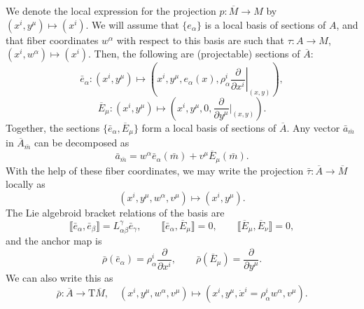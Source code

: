 \documentclass[11pt]{article}
\theoremstyle{plain}
\theoremstyle{definition}
\begin{document}
We denote the local expression for the projection $p\colon \overline{M}\to M$ by $(x^i,y^{\mu})\mapsto (x^i)$. We will assume that $\{e_{\alpha}\}$ is a local basis of sections of $A$, and that fiber coordinates $w^\alpha$ with respect to this basis are such that $\tau\colon A\to M$, $(x^i,w^{\alpha})\mapsto (x^i)$. Then, the following are (projectable) sections of $\overline{A}$: 
\begin{equation*} \label{eq:basis1}
    \bar{e}_{\alpha} \colon (x^i,y^{\mu})\longmapsto \left(x^i,y^{\mu},e_{\alpha}(x),\rho^i_\alpha \left.\frac{\partial}{\partial x^i}\right|_{(x,y)}\right),
\end{equation*}
\begin{equation*} \label{eq:basis2}
    \overline{E}_{\mu}\colon (x^i,y^{\mu})\longmapsto \left(x^i,y^{\mu},0,\frac{\partial}{\partial y^{\mu}}\Big|_{(x,y)}\right).
\end{equation*}
Together, the sections $\{\bar{e}_{\alpha},\overline{E}_{\mu}\}$ form a local basis of sections of $\overline{A}$. Any vector ${\bar a}_{\bar m}$ in ${\overline A}_{\bar m}$ can be decomposed as
\begin{equation*}
    {\bar a}_{\bar m} = w^\alpha {\bar e}_\alpha(\bar m)+ v^\mu {\overline{E}_\mu}(\bar m).
\end{equation*}
With the help of these fiber coordinates, we may write the projection $\bar\tau\colon \overline A \to \overline M$ locally as
\begin{equation*}
    (x^i,y^{\mu},w^{\alpha},v^{\mu})\longmapsto (x^i,y^{\mu}).
\end{equation*}
The Lie algebroid bracket relations of the basis are
\begin{equation*}\label{eqn:brackets}
    \llbracket \bar{e}_{\alpha},\bar{e}_{\beta}\rrbracket=L_{\alpha\beta}^\gamma {\bar e}_\gamma,\qquad \llbracket \bar{e}_{\alpha},\overline{E}_{\mu}\rrbracket=0,\qquad \llbracket \overline{E}_{\mu},\overline{E}_{\nu}\rrbracket=0,
\end{equation*}
and the anchor map is 
\begin{equation*} 
    \bar{\rho}(\bar{e}_{\alpha}) = \rho^i_\alpha \frac{\partial}{\partial x^i},\qquad \bar{\rho}(\overline{E}_{\mu})=\frac{\partial}{\partial y^{\mu}}.
\end{equation*}
We can also write this as
\begin{equation*}\label{defrhobar}
    \bar{\rho}\colon \overline{A}\longrightarrow \mathrm{T}\overline{M},\quad (x^i,y^{\mu},w^{\alpha},v^{\mu})\longmapsto (x^i,y^{\mu},\dot{x}^i=\rho_{\alpha}^i w^{\alpha}, v^\mu).
\end{equation*}
\end{document}
